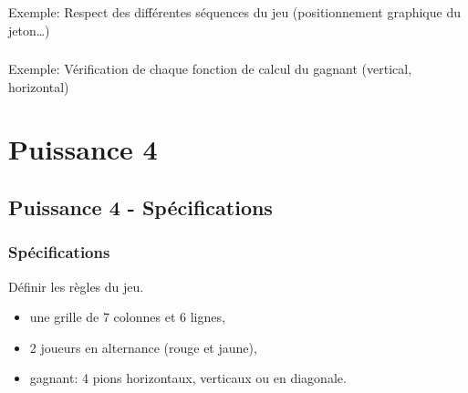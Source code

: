\documentclass[svgnames,11pt]{beamer}
\begin{document}
\begin{frame}
    \frametitle{}

    \begin{center}
    \end{center}
    Exemple: Respect des différentes séquences du jeu (positionnement graphique du jeton\dots)
\end{frame}
\begin{frame}
    \frametitle{}

    \begin{center}
    \end{center}
    Exemple: Vérification de chaque fonction de calcul du gagnant (vertical, horizontal)
\end{frame}
\section{Puissance 4}
\subsection{Puissance 4 - Spécifications}
\begin{frame}
    \frametitle{Spécifications}

    \begin{aretenir}[Rôle]
    Définir les règles du jeu.
    \end{aretenir}

\end{frame}
\begin{frame}

    \begin{itemize}
        \item une grille de 7 colonnes et 6 lignes,
        \item 2 joueurs en alternance (rouge et jaune),
        \item gagnant: 4 pions horizontaux, verticaux ou en diagonale.
    \end{itemize}

\end{frame}
\end{document}
